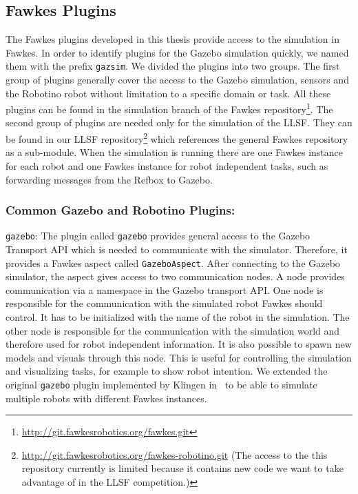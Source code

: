 \subsection{Fawkes Plugins}
The Fawkes plugins developed in this thesis provide access to the simulation in Fawkes. In order to identify plugins for the Gazebo simulation quickly, we named them with the prefix \texttt{gazsim}. We divided the plugins into two groups. The first group of plugins generally cover the access to the Gazebo simulation, sensors and the Robotino robot without limitation to a specific domain or task. All these plugins can be found in the simulation branch of the Fawkes repository\footnote{\url{http://git.fawkesrobotics.org/fawkes.git}}. The second group of plugins are needed only for the simulation of the LLSF. They can be found in our LLSF repository\footnote{\url{http://git.fawkesrobotics.org/fawkes-robotino.git} (The access to the this repository currently is limited because it contains new code we want to take advantage of in the LLSF competition.)} which references the general Fawkes repository as a sub-module. When the simulation is running there are one Fawkes instance for each robot and one Fawkes instance for robot independent tasks, such as forwarding messages from the Refbox to Gazebo. 

\subsubsection{Common Gazebo and Robotino Plugins:}

\texttt{gazebo}: The plugin called \texttt{gazebo} provides general access to the Gazebo Transport API which is needed to communicate with the simulator. Therefore, it provides a Fawkes aspect called \texttt{GazeboAspect}. After connecting to the Gazebo simulator, the aspect gives access to two communication nodes. A node provides communication via a namespace in the Gazebo transport API. One node is responsible for the communication with the simulated robot Fawkes should control. It has to be initialized with the name of the robot in the simulation. The other node is responsible for the communication with the simulation world and therefore used for robot independent information. It is also possible to spawn new models and visuals through this node. This is useful for controlling the simulation and visualizing tasks, for example to show robot intention. We extended the original \texttt{gazebo} plugin implemented by Klingen in~\cite{KlingenDA} to be able to simulate multiple robots with different Fawkes instances.\\

